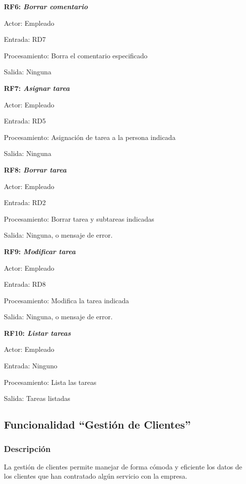 \documentclass[paper=a4, fontsize=11pt, spanish]{scrartcl}
\begin{document}
\setlength{\parindent}{0em}
\textbf{RF6: \textit{Borrar comentario}}
\setlength{\parindent}{2em}

Actor: Empleado

Entrada: RD7

Procesamiento: Borra el comentario especificado

Salida: Ninguna

\setlength{\parindent}{0em}
\textbf{RF7: \textit{Asignar tarea}}
\setlength{\parindent}{2em}

Actor: Empleado

Entrada: RD5

Procesamiento: Asignación de tarea a la persona indicada

Salida: Ninguna

\setlength{\parindent}{0em}
\textbf{RF8: \textit{Borrar tarea}}
\setlength{\parindent}{2em}

Actor: Empleado

Entrada: RD2

Procesamiento: Borrar tarea y subtareas indicadas

Salida: Ninguna, o mensaje de error.

\setlength{\parindent}{0em}
\textbf{RF9: \textit{Modificar tarea}}
\setlength{\parindent}{2em}

Actor: Empleado

Entrada: RD8

Procesamiento: Modifica la tarea indicada

Salida: Ninguna, o mensaje de error.

\setlength{\parindent}{0em}
\textbf{RF10: \textit{Listar tareas}}
\setlength{\parindent}{2em}

Actor: Empleado

Entrada: Ninguno

Procesamiento: Lista las tareas

Salida: Tareas listadas

\subsection{Funcionalidad “Gestión de Clientes”}

\subsubsection{Descripción}
\setlength{\parindent}{3em} La gestión de clientes permite manejar de forma cómoda y eficiente los datos de los clientes que han contratado algún servicio con la empresa.
\end{document}
